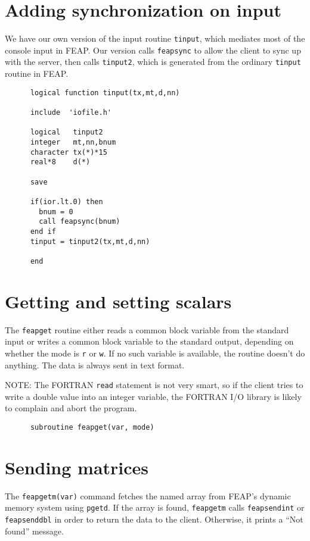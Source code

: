 \section{Adding synchronization on input}

We have our own version of the input routine {\tt tinput},
which mediates most of the console input in FEAP.  Our version
calls {\tt feapsync} to allow the client to sync up with the
server, then calls {\tt tinput2}, which is generated from the
ordinary {\tt tinput} routine in FEAP.

\begin{verbatim}
      logical function tinput(tx,mt,d,nn)

      include  'iofile.h'

      logical   tinput2
      integer   mt,nn,bnum
      character tx(*)*15
      real*8    d(*)

      save

      if(ior.lt.0) then
        bnum = 0
        call feapsync(bnum)
      end if
      tinput = tinput2(tx,mt,d,nn)

      end
\end{verbatim}
\section{Getting and setting scalars}

The {\tt feapget} routine either reads a common block variable from
the standard input or writes a common block variable to the 
standard output, depending on whether the mode is {\tt r} or {\tt w}.
If no such variable is available, the routine doesn't do anything.
The data is always sent in text format.

NOTE:  The FORTRAN {\tt read} statement is not very smart, so if
the client tries to write a double value into an integer variable,
the FORTRAN I/O library is likely to complain and abort the program.

\begin{verbatim}
      subroutine feapget(var, mode)
\end{verbatim}
\section{Sending matrices}

The {\tt feapgetm(var)} command fetches the named array from
FEAP's dynamic memory system using {\tt pgetd}.   If the array
is found, {\tt feapgetm} calls {\tt feapsendint} or {\tt feapsenddbl}
in order to return the data to the client.  Otherwise, it prints
a ``Not found'' message.

